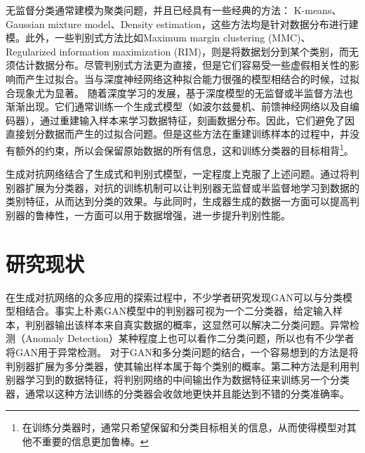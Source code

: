 无监督分类通常建模为聚类问题，并且已经具有一些经典的方法：
K-means、Gaussian mixture model、Density estimation，这些方法均是针对数据分布进行建模。此外，一些判别式方法比如Maximum margin clustering (MMC)\cite{xu2005maximum}、Regularized information maximization (RIM)\cite{krause2010discriminative}，则是将数据划分到某个类别，而无须估计数据分布。尽管判别式方法更为直接，但是它们容易受一些虚假相关性的影响而产生过拟合\cite{springenberg2015unsupervised}。当与深度神经网络这种拟合能力很强的模型相结合的时候，过拟合现象尤为显著。
随着深度学习的发展，基于深度模型的无监督或半监督方法也渐渐出现。它们通常训练一个生成式模型（如波尔兹曼机\cite{salakhutdinov2009deep,goodfellow2013multi}、前馈神经网络\cite{bengio2014deep,kingma2014semi}以及自编码器\cite{hinton2006reducing,vincent2008extracting}），通过重建输入样本来学习数据特征，刻画数据分布。因此，它们避免了因直接划分数据而产生的过拟合问题。但是这些方法在重建训练样本的过程中，并没有额外的约束，所以会保留原始数据的所有信息，这和训练分类器的目标相背\footnote{在训练分类器时，通常只希望保留和分类目标相关的信息，从而使得模型对其他不重要的信息更加鲁棒。}。

生成对抗网络结合了生成式和判别式模型，一定程度上克服了上述问题。通过将判别器扩展为分类器，对抗的训练机制可以让判别器无监督或半监督地学习到数据的类别特征，从而达到分类的效果。与此同时，生成器生成的数据一方面可以提高判别器的鲁棒性，一方面可以用于数据增强，进一步提升判别性能。


\section{研究现状}
在生成对抗网络的众多应用的探索过程中，不少学者研究发现GAN可以与分类模型相结合。事实上朴素GAN模型中的判别器可视为一个二分类器，给定输入样本，判别器输出该样本来自真实数据的概率，这显然可以解决二分类问题。异常检测（Anomaly Detection）某种程度上也可以看作二分类问题，所以也有不少学者将GAN用于异常检测\cite{schlegl2017unsupervised,zenati2018efficient,akcay2018ganomaly}。
对于GAN和多分类问题的结合，一个容易想到的方法是将判别器扩展为多分类器，使其输出样本属于每个类别的概率\cite{springenberg2015unsupervised,salimans2016improved}。第二种方法是利用判别器学习到的数据特征，将判别网络的中间输出作为数据特征来训练另一个分类器，通常以这种方法训练的分类器会收敛地更快并且能达到不错的分类准确率\cite{donahue2016adversarial,dumoulin2016adversarially}。


